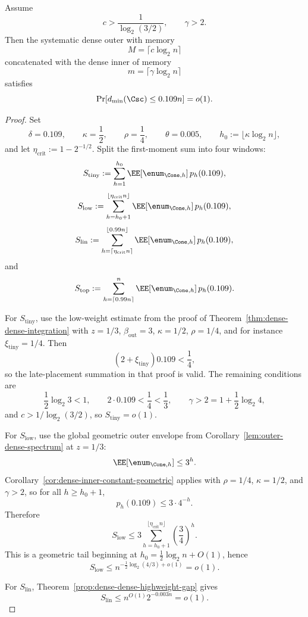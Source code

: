 \begin{theorem}
\label{thm:dense-dense-explicit-constant}
Assume
\[
c>\frac{1}{\log_2(3/2)},
\qquad
\gamma>2.
\]
Then the systematic dense outer with memory
\[
M=\lceil c\log_2 n\rceil
\]
concatenated with the dense inner of memory
\[
m=\lceil \gamma\log_2 n\rceil
\]
satisfies
\[
\Pr[d_{\min}(\Csc)\le 0.109 n]=o(1).
\]
\end{theorem}

\begin{proof}
Set
\[
\delta=0.109,
\qquad
\kappa=\frac12,
\qquad
\rho=\frac14,
\qquad
\theta=0.005,
\qquad
h_0:=\lfloor \kappa\log_2 n\rfloor,
\]
and let \(\eta_{\mathrm{crit}}:=1-2^{-1/2}\).
Split the first-moment sum into four windows:
\[
S_{\mathrm{tiny}}
:=
\sum_{h=1}^{h_0}\EE[\enum_{\Cone,h}]\,p_h(0.109),
\]
\[
S_{\mathrm{low}}
:=
\sum_{h=h_0+1}^{\lfloor \eta_{\mathrm{crit}}n\rfloor}\EE[\enum_{\Cone,h}]\,p_h(0.109),
\]
\[
S_{\mathrm{lin}}
:=
\sum_{h=\lceil \eta_{\mathrm{crit}}n\rceil}^{\lfloor 0.99n\rfloor}\EE[\enum_{\Cone,h}]\,p_h(0.109),
\]
and
\[
S_{\mathrm{top}}
:=
\sum_{h=\lceil 0.99n\rceil}^{n}\EE[\enum_{\Cone,h}]\,p_h(0.109).
\]

For \(S_{\mathrm{tiny}}\), use the low-weight estimate from the proof of
Theorem~\ref{thm:dense-dense-integration} with \(z=1/3\), \(\beta_{\mathrm{out}}=3\), \(\kappa=1/2\),
\(\rho=1/4\), and for instance \(\xi_{\mathrm{tiny}}=1/4\).  Then
\[
(2+\xi_{\mathrm{tiny}})0.109<\frac14,
\]
so the late-placement summation in that proof is valid.  The remaining
conditions are
\[
\frac12\log_2 3<1,
\qquad
2\cdot0.109<\frac14<\frac13,
\qquad
\gamma>2=1+\frac12\log_2 4,
\]
and \(c>1/\log_2(3/2)\), so \(S_{\mathrm{tiny}}=o(1)\).

For \(S_{\mathrm{low}}\), use the global geometric outer envelope from
Corollary~\ref{lem:outer-dense-spectrum} at \(z=1/3\):
\[
\EE[\enum_{\Cone,h}]\le 3^h .
\]
Corollary~\ref{cor:dense-inner-constant-geometric} applies with \(\rho=1/4\), \(\kappa=1/2\), and \(\gamma>2\),
so for all \(h\ge h_0+1\),
\[
p_h(0.109)\le 3\cdot 4^{-h}.
\]
Therefore
\[
S_{\mathrm{low}}
\le
3\sum_{h=h_0+1}^{\lfloor \eta_{\mathrm{crit}}n\rfloor}
\left(\frac34\right)^h.
\]
This is a geometric tail beginning at \(h_0=\tfrac12\log_2 n+O(1)\), hence
\[
S_{\mathrm{low}}
\le
n^{-\frac12\log_2(4/3)+o(1)}
=
o(1).
\]

For \(S_{\mathrm{lin}}\), Theorem~\ref{prop:dense-dense-highweight-gap} gives
\[
S_{\mathrm{lin}}\le n^{O(1)}2^{-0.003n}=o(1).
\]


\end{proof}
